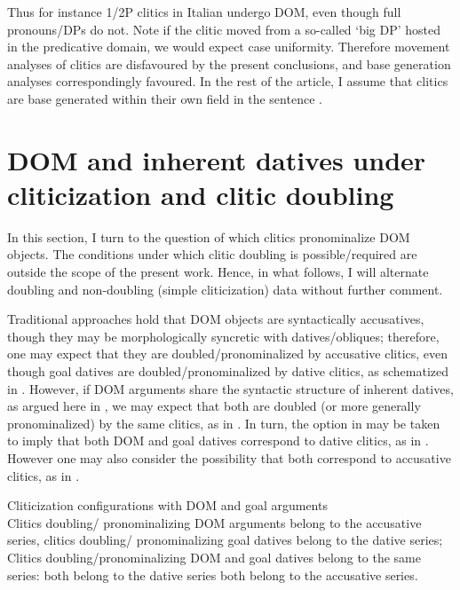 \documentclass[output=paper,colorlinks,citecolor=brown,nonflat]{./langscibook}
\begin{document}
Thus for instance 1/2P clitics in Italian undergo DOM, even though full pronouns/DPs do not. Note if the clitic moved from a so-called ‘big DP’ hosted in the predicative domain, we would expect case uniformity. Therefore movement analyses of clitics are disfavoured by the present conclusions, and base generation analyses correspondingly favoured. In the rest of the article, I assume that clitics are base generated within their own field in the sentence \citep{Sportiche1996}.

\section{DOM and inherent datives under cliticization and clitic doubling}\label{sec:manzini:3}

In this section, I turn to the question of which clitics pronominalize DOM objects. The conditions under which clitic doubling is possible/required are outside the scope of the present work. Hence, in what follows, I will alternate doubling and non-doubling (simple cliticization) data without further comment.

Traditional approaches hold that DOM objects are syntactically accusatives, though they may be morphologically syncretic with datives/obliques; therefore, one may expect that they are doubled/pronominalized by accusative clitics, even though goal datives are doubled/pronominalized by dative clitics, as schematized in . However, if DOM arguments share the syntactic structure of inherent datives, as argued here in , we may expect that both are doubled (or more generally pronominalized) by the same clitics, as in . In turn, the option in  may be taken to imply that both DOM and goal datives correspond to dative clitics, as in . However one may also consider the possibility that both correspond to accusative clitics, as in .

\ea%
    \label{ex:manzini:20}
    Cliticization configurations with DOM and goal arguments\\
    \ea\label{ex:manzini:20a}
    Clitics doubling/ pronominalizing DOM arguments belong to the accusative series, clitics doubling/ pronominalizing goal datives belong to the dative series;
    \ex\label{ex:manzini:20b}
    Clitics doubling/pronominalizing DOM and goal datives belong to the same series:
        \ea\label{ex:manzini:20bi}
        both belong to the dative series
        \ex\label{ex:manzini:20bii}
        both belong to the accusative series.
        \z
    \z
\z
\end{document}
